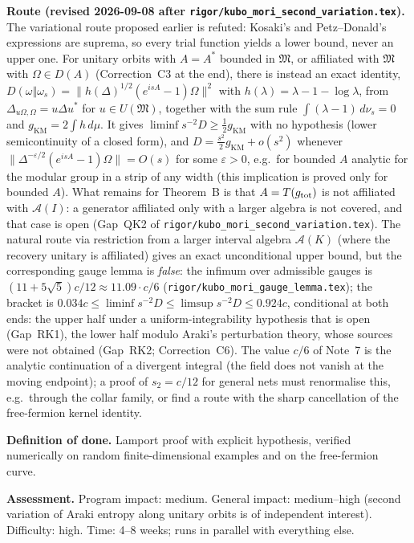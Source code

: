 \documentclass[11pt]{article}
\theoremstyle{accent}
\theoremstyle{definition}
\newcommand{\cA}{\mathcal{A}}
\newcommand{\cM}{\mathfrak{M}}
\newcommand{\eps}{\varepsilon}
\begin{document}
\textbf{Route (revised 2026-09-08 after \texttt{rigor/kubo\_mori\_second\_variation.tex}).} The variational route proposed earlier is refuted: Kosaki's and Petz--Donald's expressions are suprema, so every trial function yields a lower bound, never an upper one.  For unitary orbits with \(A=A^*\) bounded in \(\cM\), or affiliated with \(\cM\) with \(\Omega\in D(A)\) (Correction~C3 at the end), there is instead an exact identity, \(D(\omega\Vert\omega_s)=\|h(\Delta)^{1/2}(e^{isA}-1)\Omega\|^2\) with \(h(\lambda)=\lambda-1-\log\lambda\), from \(\Delta_{u\Omega,\Omega}=u\Delta u^*\) for \(u\in U(\cM)\), together with the sum rule \(\int(\lambda-1)\,d\nu_s=0\) and \(g_{\mathrm{KM}}=2\int h\,d\mu\).  It gives \(\liminf s^{-2}D\ge\frac12g_{\mathrm{KM}}\) with no hypothesis (lower semicontinuity of a closed form), and \(D=\frac{s^2}2g_{\mathrm{KM}}+o(s^2)\) whenever \(\|\Delta^{-\eps/2}(e^{isA}-1)\Omega\|=O(s)\) for some \(\eps>0\), e.g.\ for bounded \(A\) analytic for the modular group in a strip of any width (this implication is proved only for bounded \(A\)).  What remains for Theorem~B is that \(A=T(g_{\rm tot})\) is not affiliated with \(\cA(I)\): a generator affiliated only with a larger algebra is not covered, and that case is open (Gap~QK2 of \texttt{rigor/kubo\_mori\_second\_variation.tex}).  The natural route via restriction from a larger interval algebra \(\cA(K)\) (where the recovery unitary is affiliated) gives an exact unconditional upper bound, but the corresponding gauge lemma is \emph{false}: the infimum over admissible gauges is \((11+5\sqrt5)c/12\approx11.09\cdot c/6\) (\texttt{rigor/kubo\_mori\_gauge\_lemma.tex}); the bracket is \(0.034c\le\liminf s^{-2}D\le\limsup s^{-2}D\le0.924c\), conditional at both ends: the upper half under a uniform-integrability hypothesis that is open (Gap~RK1), the lower half modulo Araki's perturbation theory, whose sources were not obtained (Gap~RK2; Correction~C6).  The value \(c/6\) of Note~7 is the analytic continuation of a divergent integral (the field does not vanish at the moving endpoint); a proof of \(s_2=c/12\) for general nets must renormalise this, e.g.\ through the collar family, or find a route with the sharp cancellation of the free-fermion kernel identity.

\textbf{Definition of done.} Lamport proof with explicit hypothesis, verified numerically on random finite-dimensional examples and on the free-fermion curve.

\textbf{Assessment.} Program impact: medium.  General impact: medium--high (second variation of Araki entropy along unitary orbits is of independent interest).  Difficulty: high.  Time: 4--8 weeks; runs in parallel with everything else.
\end{document}
